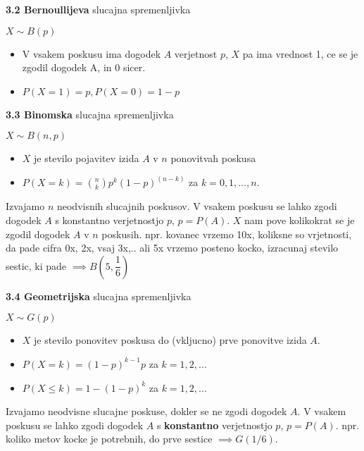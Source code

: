 \documentclass{article}
\begin{document}
\begin{multicols}{2}
\textbf{3.2 Bernoullijeva} slucajna spremenljivka
\begin{center}
    \begin{math}
        X \sim B(p)
    \end{math}
\end{center}
\begin{itemize}
    \item V vsakem poskusu ima dogodek $A$ verjetnost $p$, $X$ pa ima vrednost 1, ce se je zgodil dogodek A, in 0 sicer.
    \item $P(X = 1) = p, P(X = 0) = 1 - p$
\end{itemize}


\textbf{3.3 Binomska} slucajna spremenljivka
\begin{center}
    \begin{math}
        X \sim B(n, p)
    \end{math}
\end{center}
\begin{itemize}
    \item $X$ je stevilo pojavitev izida $A$ v $n$ ponovitvah poskusa
    \item $P(X = k) = {n \choose k} p^{k} (1 - p)^{(n - k)}$ za $k = 0,1, \dots, n.$
\end{itemize}
Izvajamo $n$ neodvisnih slucajnih poskusov. V vsakem poskusu se lahko zgodi dogodek $A$ s 
konstantno verjetnostjo $p$, $p =  P(A)$. 
$X$ nam pove kolikokrat se je zgodil dogodek $A$ v $n$ poskusih.
npr. kovanec vrzemo 10x, koliksne so vrjetnosti, da pade cifra 0x, 2x, vsaj 3x,..
ali 5x vrzemo posteno kocko, izracunaj stevilo sestic, ki pade $\implies B(5, \dfrac{1}{6})$

\textbf{3.4 Geometrijska} slucajna spremenljivka
\begin{center}
    \begin{math}
        X \sim G(p)
    \end{math}
\end{center}
\begin{itemize}
    \item $X$ je stevilo ponovitev poskusa do (vkljucno) prve ponovitve izida $A$.
    \item $P(X = k) = (1 - p)^{k - 1} p$ za $k = 1,2, \dots$ 
    \item $P(X \leq k) = 1 - (1 - p)^{k}$ za $k = 1,2, \dots$
\end{itemize}
Izvajamo  neodvisne slucajne poskuse, dokler se ne zgodi dogodek $A$. V vsakem poskusu
se lahko zgodi dogodek $A$  s \textbf{konstantno} verjetnostjo $p$, $p =  P(A)$.
npr. koliko metov kocke je potrebnih, do prve sestice $\implies G(1/6)$.


\end{multicols}
\end{document}
